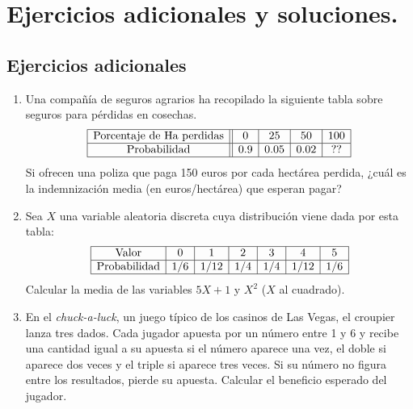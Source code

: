 \documentclass[10pt,a4paper]{article}\usepackage[]{graphicx}\usepackage[]{color}
\begin{document}
\section{Ejercicios adicionales y soluciones.}
\label{tut04:sec:EjerciciosAdicionalesYSoluciones}

\subsection*{Ejercicios adicionales}
\label{tut04:subsec:EjerciciosAdicionales}

\begin{enumerate}

\subsubsection*{Función de densidad de una variable aleatoria discreta.}

\item Una compañía de seguros agrarios ha recopilado la siguiente tabla sobre seguros para pérdidas en cosechas.
        \[
        \begin{array}{|c||c|c|c|c|}
        \hline
        \mbox{Porcentaje de Ha perdidas}&0&25&50&100\\
        \hline
        \mbox{Probabilidad}&0.9&0.05&0.02& ??\\
        \hline
        \end{array}
        \]
    Si ofrecen una poliza que paga 150 euros por cada hectárea perdida, ¿cuál es la indemnización media (en euros/hectárea) que esperan pagar?



    \item Sea $X$ una variable aleatoria discreta cuya distribución viene dada por esta tabla:
        \[
        \begin{array}{|c|c|c|c|c|c|c|}
        \hline
        \mbox{Valor}&0&1&2&3&4&5\\
        \hline
        \mbox{Probabilidad}&1/6&1/12&1/4&1/4&1/12&1/6\\
        \hline
        \end{array}
        \]
        Calcular la media de las variables $5X+1$ y  $X^2$ ($X$ al cuadrado).


    \item En el {\em chuck-a-luck}, un juego típico de los casinos de Las Vegas, el croupier lanza tres dados. Cada jugador apuesta por un número entre 1 y 6 y recibe una cantidad igual a su apuesta si el número aparece una        vez, el doble si aparece dos veces y el triple si aparece tres veces.         Si su número no figura entre los resultados, pierde su apuesta.
        Calcular el beneficio esperado del jugador.



\end{enumerate}
\end{document}
